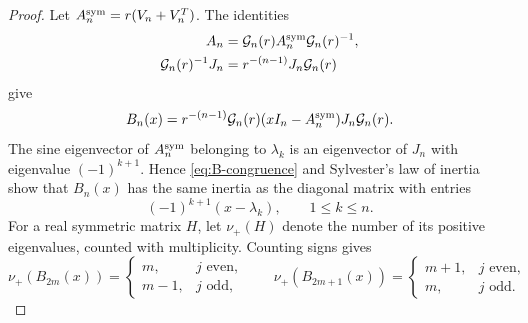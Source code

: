 \documentclass[preprints,article,accept,oneauthor]{Definitions/mdpi}
\numberwithin{equation}{section}
\theoremstyle{mdpi}
\theoremstyle{definition}
\begin{document}
\begin{proof}
Let \(A_n^{\rm sym}=r(V_n+V_n^T)\).  The identities
\[
 \begin{aligned}
 A_n&=\mathcal G_n(r)A_n^{\rm sym}\mathcal G_n(r)^{-1},\\
 \mathcal G_n(r)^{-1}J_n
 &=r^{-(n-1)}J_n\mathcal G_n(r)
 \end{aligned}
\]
give
\begin{equation}\label{eq:B-congruence}
 B_n(x)=r^{-(n-1)}\mathcal G_n(r)(xI_n-A_n^{\rm sym})
 J_n\mathcal G_n(r).
\end{equation}
The sine eigenvector of \(A_n^{\rm sym}\) belonging to \(\lambda_k\) is an
eigenvector of \(J_n\) with eigenvalue \((-1)^{k+1}\).  Hence
\eqref{eq:B-congruence} and Sylvester's law of inertia show that
\(B_n(x)\) has the same inertia as the diagonal matrix with entries
\[
 (-1)^{k+1}(x-\lambda_k),\qquad 1\leq k\leq n.
\]
For a real symmetric matrix \(H\), let \(\nu_+(H)\) denote the number of its
positive eigenvalues, counted with multiplicity.  Counting signs gives
\begin{equation}\label{eq:middle-inertia}
 \nu_+(B_{2m}(x))=
 \begin{cases}m,&j\text{ even},\\m-1,&j\text{ odd},\end{cases}
 \qquad
 \nu_+(B_{2m+1}(x))=
 \begin{cases}m+1,&j\text{ even},\\m,&j\text{ odd}.
 \end{cases}
\end{equation}


\end{proof}
\end{document}
